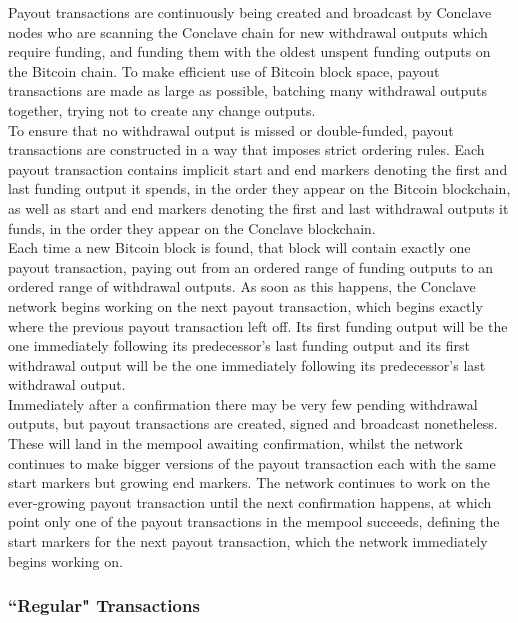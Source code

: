 \documentclass{report}
\begin{document}
			Payout transactions are continuously being created and broadcast by Conclave nodes who are scanning the Conclave chain for new withdrawal outputs which require funding, and funding them with the oldest unspent funding outputs on the Bitcoin chain. To make efficient use of Bitcoin block space, payout transactions are made as large as possible, batching many withdrawal outputs together, trying not to create any change outputs. \\
			
			To ensure that no withdrawal output is missed or double-funded, payout transactions are constructed in a way that imposes strict ordering  rules. Each payout transaction  contains implicit start and end markers denoting the first and last funding output  it spends, in the order they appear on the Bitcoin blockchain, as well as start and end markers denoting the first and last withdrawal outputs it funds, in the order they appear on the Conclave blockchain. \\
			
			Each time a new Bitcoin block is found, that block will contain exactly one payout transaction, paying out from an ordered range of funding outputs to an ordered range of withdrawal outputs. As soon as this happens, the Conclave network begins working on the next payout transaction, which begins exactly where the previous payout transaction left off. Its first funding output will be the one immediately following its predecessor's last funding output and its first withdrawal output will be the one immediately following its predecessor's last withdrawal output. \\
			
			Immediately after a confirmation there may be very few pending withdrawal outputs, but payout transactions are created, signed and broadcast nonetheless. These will land in the mempool awaiting confirmation, whilst the network continues to make bigger versions of the payout transaction each with the same start markers but growing end markers. The network continues to work on the ever-growing payout transaction until the next confirmation happens, at which point only one of the payout transactions in the mempool succeeds, defining the start markers for the next payout transaction, which the network immediately begins working on.
			
			\subsubsection{``Regular" Transactions}
			
\end{document}
